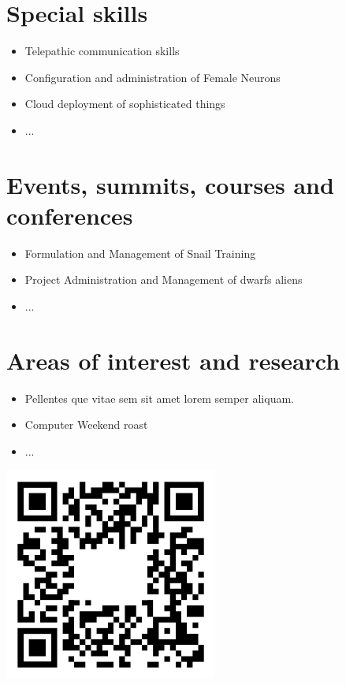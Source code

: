 \documentclass[overlapped,line,final]{res}
\begin{document}
\begin{resume}
\section{\sc Special skills}
\vspace{0.5cm}
\begin{itemize}
	\item Telepathic communication skills 
	\item Configuration and administration of Female Neurons
	\item Cloud deployment of sophisticated things
	\item ...	
\end{itemize}

\section{\sc Events, summits, courses and conferences}
\vspace{0.5cm}
\begin{itemize}
	\item Formulation and Management of Snail Training
	\item Project Administration and Management of dwarfs aliens
	\item ...
\end{itemize} 

\section{\sc Areas of interest and research}
\vspace{0.5cm}
\begin{itemize}
	\item Pellentes que vitae sem sit amet lorem semper aliquam.
    	\item Computer Weekend roast
	\item ...
\end{itemize}

\vspace{\fill}
\begin{minipage}{1.0\linewidth}
\begin{center}	
	\includegraphics[width=7cm,bb=0 0 1147 1147]{./qr.png}
\end{center}
\end{minipage}



\end{resume}
\end{document}
